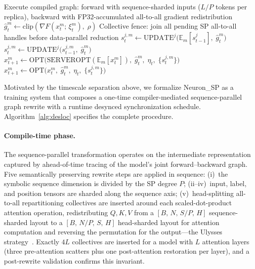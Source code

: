 \documentclass{article}
\begin{document}
\begin{algorithm}[t]
\begin{algorithmic}[1]
\medskip
{}
    \STATE Execute compiled graph: forward with sequence-sharded inputs
           ($L/P$ tokens per replica), backward with FP32-accumulated all-to-all
           gradient redistribution
    \STATE $\hat{g}^m_t \gets \mathrm{clip}(\nabla F(x^m_t;\, \xi^m_t),\;\rho)$
    \STATE Collective fence: join all pending SP all-to-all handles
           before data-parallel reduction
        \STATE $s^{j,m}_t \gets
               \mathrm{UPDATE}^j\!\bigl(\mathbb{E}_m[s^{j}_{t-1}],\;
               \hat{g}^m_t\bigr)$
      \ELSE
        \STATE $s^{j,m}_t \gets
               \mathrm{UPDATE}^j\!\bigl(s^{j,m}_{t-1},\;
               \hat{g}^m_t\bigr)$
      \ENDIF
    \ENDFOR
      \STATE $x^m_{t+1} \gets
             \mathrm{OPT}\!\bigl(\mathrm{SERVEROPT}(\mathbb{E}_m[x^m_t]),\;
             \hat{g}^m_t,\;\eta_t,\;\{s^{j,m}_t\}\bigr)$
    \ELSE
      \STATE $x^m_{t+1} \gets
             \mathrm{OPT}\!\bigl(x^m_t,\;\hat{g}^m_t,\;\eta_t,\;
             \{s^{j,m}_t\}\bigr)$
    \ENDIF
  \ENDFOR
\ENDFOR
\end{algorithmic}
\end{algorithm}

Motivated by the timescale separation above, we formalize Neuron\_SP as a
training system that composes a one-time compiler-mediated
sequence-parallel graph rewrite with a runtime desynced synchronization
schedule. Algorithm~\ref{alg:desloc} specifies the complete procedure.

\paragraph{Compile-time phase.}
The sequence-parallel transformation operates on the intermediate
representation captured by ahead-of-time tracing of the model's joint
forward--backward graph. Five semantically preserving rewrite steps are
applied in sequence: (i)~the symbolic sequence dimension is divided by
the SP degree $P$; (ii--iv)~input, label, and position tensors are
sharded along the sequence axis; (v)~head-splitting all-to-all
repartitioning collectives are inserted around each scaled-dot-product
attention operation, redistributing $Q,K,V$ from a
$[B,\,N,\,S/P,\,H]$ sequence-sharded layout to a $[B,\,N/P,\,S,\,H]$
head-sharded layout for attention computation and reversing the
permutation for the output---the Ulysses strategy~\citep{fang2024unified}.
Exactly $4L$ collectives are inserted for a model with $L$ attention layers
(three pre-attention scatters plus one post-attention restoration per layer),
and a post-rewrite validation confirms this invariant.
\end{document}
